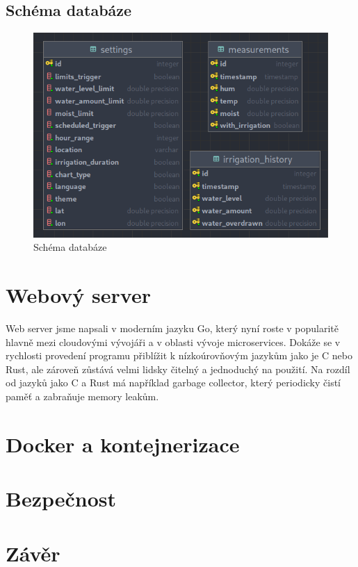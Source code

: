 \documentclass[12pt,a4paper]{article}
\begin{document}
\subsection{Schéma databáze}

\begin{figure}[h]
	\centering
	\includegraphics[width=0.9\linewidth]{db.png}
	\caption{Schéma databáze}
\end{figure}

\section{Webový server}

Web server jsme napsali v moderním jazyku Go, který nyní roste v popularitě hlavně mezi cloudovými vývojáři a v oblasti vývoje microservices. Dokáže se v rychlosti provedení programu přiblížit k nízkoúrovňovým jazykům jako je C nebo Rust, ale zároveň zůstává velmi lidsky čitelný a jednoduchý na použití. Na rozdíl od jazyků jako C a Rust má například garbage collector, který periodicky čistí paměť a zabraňuje memory leakům.

\section{Docker a kontejnerizace}

\section{Bezpečnost}

\section{Závěr}
\end{document}
